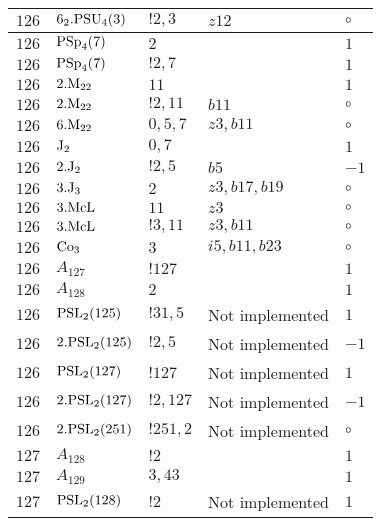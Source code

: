 \documentclass[a4paper, 11pt]{article}
\begin{document}
\begin{longtable}{lllll}
        $ 126 $ & $ 6_2.{\rm PSU}_{4}(3) $ & $ ! 2,3 $ & $ z12 $ &  $\circ$ \\ \hline
        $ 126 $ & $ {\rm PSp}_{4}(7) $ & $ 2 $ & $ ~ $ & $ 1$ \\ \hline
        $ 126 $ & $ {\rm PSp}_{4}(7) $ & $ ! 2,7 $ & $ ~ $ & $ 1$ \\ \hline
        $ 126 $ & $ 2.{\rm M}_{22} $ & $ 11 $ & $ ~ $ & $ 1$ \\ \hline
        $ 126 $ & $ 2.{\rm M}_{22} $ & $ ! 2,11 $ & $ b11 $ &  $\circ$ \\ \hline
        $ 126 $ & $ 6.{\rm M}_{22} $ & $ 0, 5, 7 $ & $ z3, b11 $ &  $\circ$ \\ \hline
        $ 126 $ & $ {\rm J}_2 $ & $ 0,7 $ & $ ~ $ & $ 1$ \\ \hline
        $ 126 $ & $ 2.{\rm J}_2 $ & $ ! 2,5 $ & $ b5 $ & $ -1$ \\ \hline
        $ 126 $ & $ 3.{\rm J}_3 $ & $ 2 $ & $ z3, b17, b19 $ &  $\circ$ \\ \hline
        $ 126 $ & $ 3.{\rm McL} $ & $ 11 $ & $ z3 $ &  $\circ$ \\ \hline
        $ 126 $ & $ 3.{\rm McL} $ & $ ! 3,11 $ & $ z3, b11 $ &  $\circ$ \\ \hline
        $ 126 $ & $ {\rm Co}_{3} $ & $ 3 $ & $ i5, b11, b23 $ &  $\circ$ \\ \hline
        $ 126 $ & $ A_{127} $ & $ !127 $ & $ ~ $ & $ 1$ \\ \hline
        $ 126 $ & $ A_{128} $ & $ 2 $ & $ ~ $ & $ 1$ \\ \hline
        $ 126 $ & $ {\rm PSL}_{2}(125) $ & $ !31, 5 $ &  Not implemented & $ 1$ \\ \hline
        $ 126 $ & $ 2.{\rm PSL}_{2}(125) $ & $ !2, 5 $ &  Not implemented & $ -1$ \\ \hline
        $ 126 $ & $ {\rm PSL}_{2}(127) $ & $ !127 $ &  Not implemented & $ 1$ \\ \hline
        $ 126 $ & $ 2.{\rm PSL}_{2}(127) $ & $ !2, 127 $ &  Not implemented & $ -1$ \\ \hline
        $ 126 $ & $ 2.{\rm PSL}_{2}(251) $ & $ !251, 2 $ &  Not implemented &  $\circ$ \\ \hline
        $ 127 $ & $ A_{128} $ & $ !2 $ & $ ~ $ & $ 1$ \\ \hline
        $ 127 $ & $ A_{129} $ & $ 3, 43 $ & $ ~ $ & $ 1$ \\ \hline
        $ 127 $ & $ {\rm PSL}_{2}(128) $ & $ !2 $ &  Not implemented & $ 1$ \\ \hline

\end{longtable}
\end{document}
